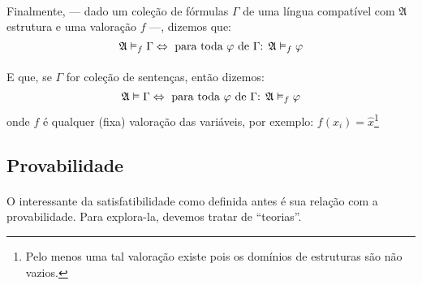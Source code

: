         \paragraph{}
            Finalmente, --- dado um coleção de fórmulas $\Gamma$
            de uma língua compatível com $\mathfrak A$ estrutura e uma 
            valoração $f$ ---, dizemos que:
            $$\mathfrak{A}\vDash_f\Gamma\Leftrightarrow\text{ para toda }\varphi\text{ de }\Gamma\text{: }\mathfrak{A}\vDash_f\varphi$$
        \paragraph{}
            E que, se $\Gamma$ for coleção de sentenças, então dizemos:
            $$\mathfrak{A}\vDash\Gamma\Leftrightarrow\text{ para toda }\varphi\text{ de }\Gamma\text{: }\mathfrak{A}\vDash_f\varphi$$
            onde $f$ é qualquer (fixa) valoração das variáveis, por exemplo: $f(x_i)=\hat{x}$\footnote{Pelo menos uma tal 
            valoração existe pois os domínios de estruturas são não vazios.}

        \subsection{Provabilidade}
        \paragraph{}
            O interessante da satisfatibilidade como 
            definida antes é sua relação com a
            provabilidade. Para explora-la, devemos 
            tratar de ``teorias''.
